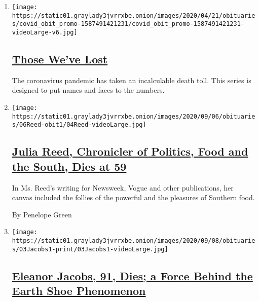 \begin{enumerate}
\def\labelenumi{\arabic{enumi}.}
\item
  \texttt{[image: https://static01.graylady3jvrrxbe.onion/images/2020/04/21/obituaries/covid\_obit\_promo-1587491421231/covid\_obit\_promo-1587491421231-videoLarge-v6.jpg]}

  \hypertarget{those-weve-lost}{%
  \subsection{\texorpdfstring{\href{https://www.nytimes3xbfgragh.onion/interactive/2020/obituaries/people-died-coronavirus-obituaries.html}{Those
  We've Lost}}{Those We've Lost}}\label{those-weve-lost}}

  The coronavirus pandemic has taken an incalculable death toll. This
  series is designed to put names and faces to the numbers.
\item
  \texttt{[image: https://static01.graylady3jvrrxbe.onion/images/2020/09/06/obituaries/06Reed-obit1/04Reed-videoLarge.jpg]}

  \hypertarget{julia-reed-chronicler-of-politics-food-and-the-south-dies-at-59}{%
  \subsection{\texorpdfstring{\href{/2020/09/04/dining/julia-reed-dead.html}{Julia
  Reed, Chronicler of Politics, Food and the South, Dies at
  59}}{Julia Reed, Chronicler of Politics, Food and the South, Dies at 59}}\label{julia-reed-chronicler-of-politics-food-and-the-south-dies-at-59}}

  In Ms. Reed's writing for Newsweek, Vogue and other publications, her
  canvas included the follies of the powerful and the pleasures of
  Southern food.

  By Penelope Green
\item
  \texttt{[image: https://static01.graylady3jvrrxbe.onion/images/2020/09/08/obituaries/03Jacobs1-print/03Jacobs1-videoLarge.jpg]}

  \hypertarget{eleanor-jacobs-91-dies-a-force-behind-the-earth-shoe-phenomenon}{%
  \subsection{\texorpdfstring{\href{/2020/09/05/fashion/eleanor-jacobs-91-dies-a-force-behind-the-earth-shoe-phenomenon.html}{Eleanor
  Jacobs, 91, Dies; a Force Behind the Earth Shoe
  Phenomenon}}{Eleanor Jacobs, 91, Dies; a Force Behind the Earth Shoe Phenomenon}}\label{eleanor-jacobs-91-dies-a-force-behind-the-earth-shoe-phenomenon}}


\end{enumerate}
